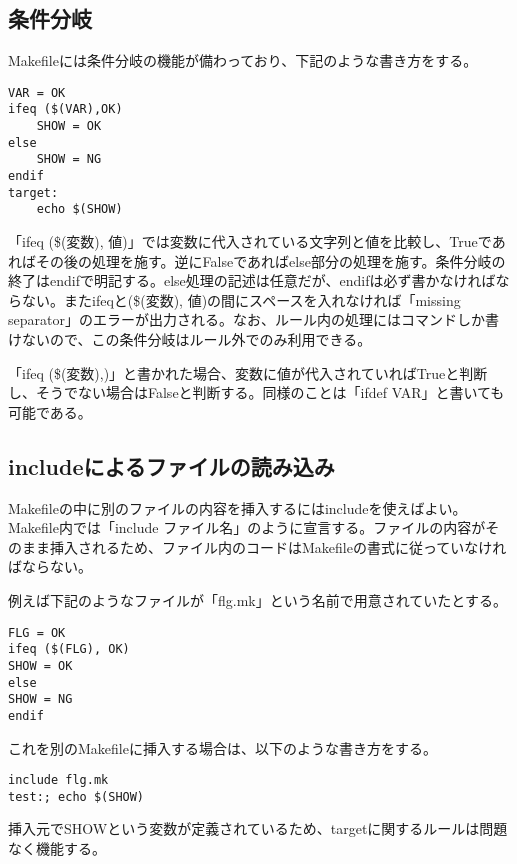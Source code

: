 \documentclass[dvipdfmx, 9pt, a4paper]{jsarticle}
\numberwithin{equation}{section}
\begin{document}
\subsection{条件分岐}
Makefileには条件分岐の機能が備わっており、下記のような書き方をする。
\begin{lstlisting}[caption=条件分岐]
VAR = OK
ifeq ($(VAR),OK)
	SHOW = OK
else
	SHOW = NG
endif
target:
	echo $(SHOW)
\end{lstlisting}\par
「ifeq (\$(変数), 値)」では変数に代入されている文字列と値を比較し、Trueであればその後の処理を施す。逆にFalseであればelse部分の処理を施す。条件分岐の終了はendifで明記する。else処理の記述は任意だが、endifは必ず書かなければならない。またifeqと(\$(変数), 値)の間にスペースを入れなければ「missing separator」のエラーが出力される。なお、ルール内の処理にはコマンドしか書けないので、この条件分岐はルール外でのみ利用できる。\par
「ifeq (\$(変数),)」と書かれた場合、変数に値が代入されていればTrueと判断し、そうでない場合はFalseと判断する。同様のことは「ifdef VAR」と書いても可能である。

\subsection{includeによるファイルの読み込み}
Makefileの中に別のファイルの内容を挿入するにはincludeを使えばよい。Makefile内では「include ファイル名」のように宣言する。ファイルの内容がそのまま挿入されるため、ファイル内のコードはMakefileの書式に従っていなければならない。\par
例えば下記のようなファイルが「flg.mk」という名前で用意されていたとする。
\begin{lstlisting}[caption=挿入ファイル]
FLG = OK
ifeq ($(FLG), OK)
SHOW = OK
else
SHOW = NG
endif
\end{lstlisting}\par
これを別のMakefileに挿入する場合は、以下のような書き方をする。
\begin{lstlisting}[caption=挿入ファイル2]
include flg.mk
test:; echo $(SHOW)
\end{lstlisting}\par
挿入元でSHOWという変数が定義されているため、targetに関するルールは問題なく機能する。
\end{document}
